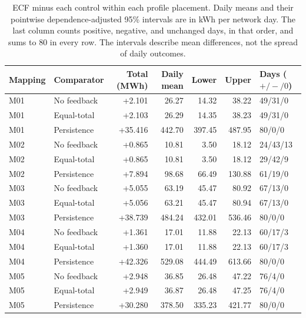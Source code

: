 \begin{table}[!htbp]
\centering
\caption{ECF minus each control within each profile placement.
Daily means and their pointwise dependence-adjusted 95\% intervals are in
kWh per network day. The last column counts positive, negative, and unchanged
days, in that order, and sums to 80 in every row. The intervals describe mean
differences, not the spread of daily outcomes.}
\label{tab:supp_mapping_contrasts}
\small
\begin{tabular}{@{}llrrrrl@{}}
\toprule
Mapping & Comparator & Total (MWh) & Daily mean & Lower & Upper & Days ($+/-/0$) \\
\midrule
M01 & No feedback & +2.101 & 26.27 & 14.32 & 38.22 & 49/31/0 \\
M01 & Equal-total & +2.103 & 26.29 & 14.35 & 38.23 & 49/31/0 \\
M01 & Persistence & +35.416 & 442.70 & 397.45 & 487.95 & 80/0/0 \\
\addlinespace
M02 & No feedback & +0.865 & 10.81 & 3.50 & 18.12 & 24/43/13 \\
M02 & Equal-total & +0.865 & 10.81 & 3.50 & 18.12 & 29/42/9 \\
M02 & Persistence & +7.894 & 98.68 & 66.49 & 130.88 & 61/19/0 \\
\addlinespace
M03 & No feedback & +5.055 & 63.19 & 45.47 & 80.92 & 67/13/0 \\
M03 & Equal-total & +5.056 & 63.21 & 45.47 & 80.94 & 67/13/0 \\
M03 & Persistence & +38.739 & 484.24 & 432.01 & 536.46 & 80/0/0 \\
\addlinespace
M04 & No feedback & +1.361 & 17.01 & 11.88 & 22.13 & 60/17/3 \\
M04 & Equal-total & +1.360 & 17.01 & 11.88 & 22.13 & 60/17/3 \\
M04 & Persistence & +42.326 & 529.08 & 444.49 & 613.66 & 80/0/0 \\
\addlinespace
M05 & No feedback & +2.948 & 36.85 & 26.48 & 47.22 & 76/4/0 \\
M05 & Equal-total & +2.949 & 36.87 & 26.48 & 47.25 & 76/4/0 \\
M05 & Persistence & +30.280 & 378.50 & 335.23 & 421.77 & 80/0/0 \\
\bottomrule
\end{tabular}
\end{table}
